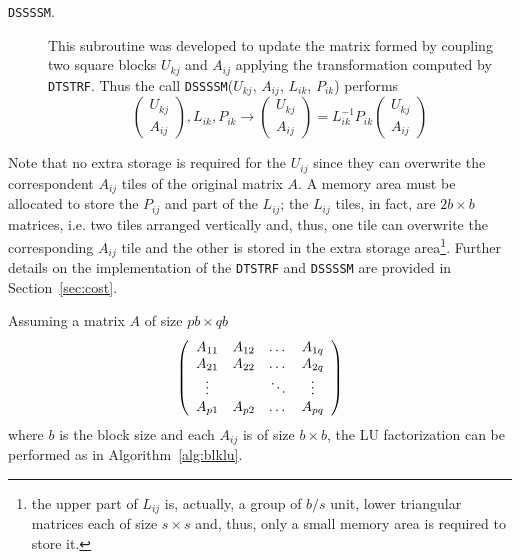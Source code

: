\documentclass{article}
\begin{document}
\begin{description}
\item[\texttt{DSSSSM}.] This subroutine was developed to update the
  matrix formed by coupling two square blocks $U_{kj}$ and $A_{ij}$ applying the
  transformation computed by \texttt{DTSTRF}. Thus the call
  \texttt{DSSSSM}($U_{kj}$, $A_{ij}$, $L_{ik}$, $P_{ik}$) performs
  \begin{displaymath}
    \left(
      \begin{array}{c}
        U_{kj}\\
        A_{ij}
      \end{array}\right), L_{ik}, P_{ik} \longrightarrow \left(\begin{array}{c}
        U_{kj}\\
        A_{ij}
      \end{array}\right)= L_{ik}^{-1}P_{ik} \left(\begin{array}{c}
        U_{kj}\\
        A_{ij}
      \end{array}\right)
  \end{displaymath}
\end{description}


Note that no extra storage is required for the $U_{ij}$ since they can
overwrite the correspondent $A_{ij}$ tiles of the original matrix
$A$. A memory area must be allocated to store the $P_{ij}$ and part of
the $L_{ij}$; the $L_{ij}$ tiles, in fact, are $2b \times b$ matrices,
i.e. two tiles arranged vertically and, thus, one tile can overwrite
the corresponding $A_{ij}$ tile and the other is stored in the extra
storage area\footnote{the upper part of $L_{ij}$ is, actually, a group
  of $b/s$ unit, lower triangular matrices each of size $s \times s$
  and, thus, only a small memory area is required to store it.}.
Further details on the implementation of the \texttt{DTSTRF} and
\texttt{DSSSSM} are provided in Section~\ref{sec:cost}.

Assuming a matrix $A$ of size $pb \times qb$
\begin{displaymath}
  \left(\begin{array}[!h]{cccc}
    A_{11}  & A_{12} & \dots  & A_{1q}  \\
    A_{21}  & A_{22} & \dots  & A_{2q}  \\
    \vdots &       & \ddots & \vdots \\
    A_{p1}  & A_{p2} & \dots  & A_{pq}
  \end{array}\right)
\end{displaymath}
where $b$ is the block size and each $A_{ij}$ is of size $b \times b$,
the LU factorization can be performed as in Algorithm~\ref{alg:blklu}.
\end{document}
